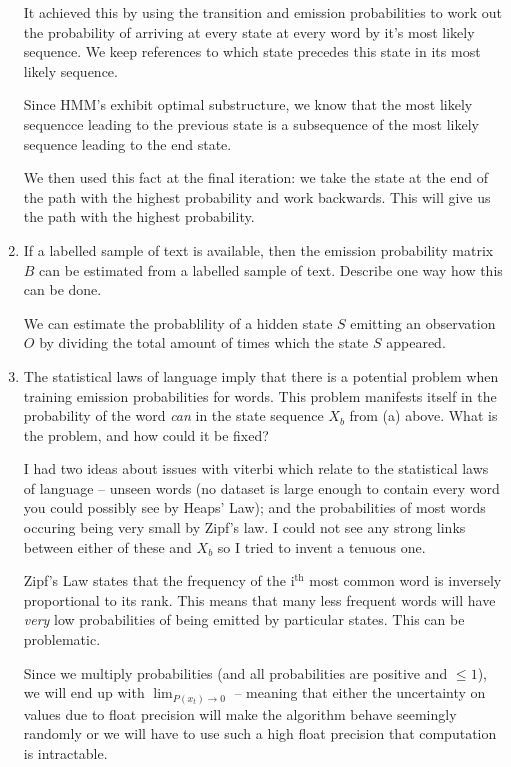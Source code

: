 \documentclass[10pt,\jkfside,a4paper]{article}
\begin{document}
\begin{enumerate}
It achieved this by using the transition and emission 
probabilities to work out the probability of arriving at every state 
at every word by it's most likely sequence. We keep references to which state precedes 
this state in its most likely sequence. 

Since HMM's exhibit optimal substructure, we 
know that the most likely sequencce leading to the previous state is a subsequence of 
the most likely sequence leading to the end state.

We then used this fact at the final iteration: we take the state at the end of the path 
with the highest probability and work backwards. This will give us the path with the highest 
probability.

\item If a labelled sample of text is available, then the emission probability
matrix $B$ can be estimated from a labelled sample of text. Describe one
way how this can be done.

We can estimate the probablility of a hidden state $S$ emitting an observation 
$O$ by dividing the total amount of times which the state $S$ appeared.

\item The statistical laws of language imply that there is a potential problem
when training emission probabilities for words. This problem manifests
itself in the probability of the word \textit{can} in the state sequence $X_b$ from (a)
above. What is the problem, and how could it be fixed?

I had two ideas about issues with viterbi which relate to the statistical laws of language -- 
unseen words (no dataset is large enough to contain every word you could possibly see by Heaps' Law); 
and the probabilities of most words occuring being very small by Zipf's law. I could not see 
any strong links between either of these and $X_b$ so I tried to invent a tenuous one.

Zipf's Law states that the frequency of the $\text{i}^{\text{th}}$ most 
common word is inversely proportional to its rank. This means that many less frequent words 
will have \textit{very} low probabilities of being emitted by particular states. 
This can be problematic.

Since we multiply 
probabilities (and all probabilities are positive and $\leq 1$), we will end up with 
$\lim_{P(x_t) \longrightarrow 0}$ -- meaning that either the uncertainty on values 
due to float precision will make the algorithm behave seemingly randomly or we will 
have to use such a high float precision that computation is intractable.


\end{enumerate}
\end{document}
